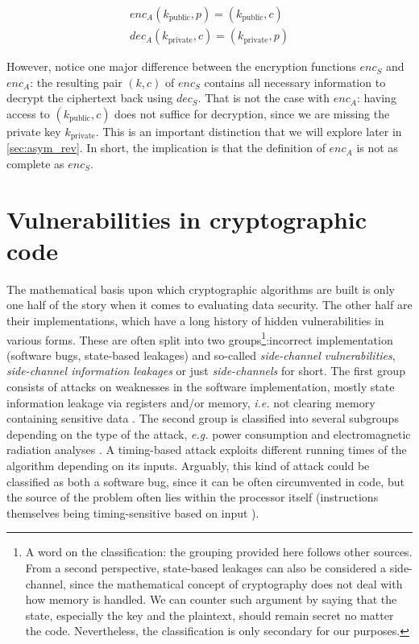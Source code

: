 \documentclass[a4paper,10pt,openright]{memoir}
\newcommand{\ie}{\emph{i.e.}\xspace}
\newcommand{\eg}{\emph{e.g.}\xspace}
\def\enc{\ensuremath{\mathit{enc}}}
\def\dec{\ensuremath{\mathit{dec}}}
\newcommand{\term}[1]{\textit{#1}}
\begin{document}
\begin{align*}
\enc_A(k_\text{public},p) = (k_\text{public},c) \\
\dec_A(k_\text{private},c) = (k_\text{private},p) 
\end{align*}

However, notice one major difference between the encryption functions 
$\enc_S$ and $\enc_A$: the resulting pair $(k, c)$ of $\enc_S$ contains 
all necessary information to decrypt the ciphertext back using 
$\dec_S$. That is not the case with $\enc_A$: having access to 
$(k_\text{public},c)$ does not suffice for decryption, since we are 
missing the private key $k_\text{private}$. This is an important 
distinction that we will explore later in \ref{sec:asym_rev}. In short, 
the implication is that the definition of $\enc_A$ is not as complete 
as $\enc_S$.

\section{Vulnerabilities in cryptographic code}

The mathematical basis upon which cryptographic algorithms are built is 
only one half of the story when it comes to evaluating data security. 
The other half are their implementations, which have a long history of 
hidden vulnerabilities in various forms. These are often split into two 
groups\footnote{A word on the classification: the grouping provided 
here follows other sources. From a second perspective, state-based 
leakages can also be considered a side-channel, since the mathematical 
concept of cryptography does not deal with how memory is handled. We 
can counter such argument by saying that the state, especially the key 
and the plaintext, should remain secret no matter the code. 
Nevertheless, the classification is only secondary for our 
purposes.}:incorrect implementation (software bugs, state-based 
leakages) and so-called \term{side-channel vulnerabilities}, 
\term{side-channel information leakages} or just \term{side-channels} 
for short. The first group consists of attacks on weaknesses in the 
software implementation, mostly state information leakage via registers 
and/or memory, \ie not clearing memory containing sensitive data 
\cite{Chow:2004}. The second group is classified into several subgroups 
depending on the type of the attack, \eg power consumption and 
electromagnetic radiation analyses \cite{Spreitzer:2016}. A 
timing-based attack exploits different running times of the algorithm 
depending on its inputs. Arguably, this kind of attack could be 
classified as both a software bug, since it can be often circumvented 
in code, but the source of the problem often lies within the processor 
itself (instructions themselves being timing-sensitive based on input 
\cite{TimingRC5}).
\end{document}
